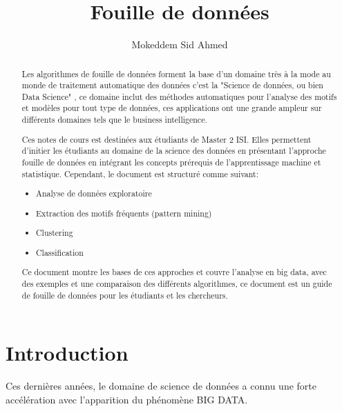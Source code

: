 \documentclass[runningheads,a4paper]{llncs}
\begin{document}
\mainmatter 

\title{Fouille de données}


\author{Mokeddem Sid Ahmed}



	
\tocauthor{{}}

\maketitle

\begin{abstract}
Les algorithmes de fouille de données forment la base d'un domaine très à la mode au monde de traitement automatique des données c'est la "Science de données, ou bien Data Science" , ce domaine inclut des méthodes automatiques pour l'analyse des motifs et modèles pour tout type de données, ces applications ont une grande ampleur sur différents domaines tels que le business intelligence. 

Ces notes de cours est destinées aux étudiants de Master 2 ISI. Elles permettent d'initier les étudiants au domaine de la science des données en présentant l'approche fouille de données en intégrant les concepts prérequis de l'apprentissage machine et statistique. Cependant, le document est structuré comme suivant: 
\begin{itemize}
  \item Analyse de données exploratoire
  \item Extraction des motifs fréquents (pattern mining)
  \item Clustering
  \item Classification
\end{itemize}   
Ce document montre les bases de ces approches et couvre l'analyse en big data, avec des exemples et une comparaison des différents algorithmes, ce document est un guide de fouille de données pour les étudiants et les chercheurs. 
\end{abstract}
\medskip

\begingroup
\let\clearpage\relax
\tableofcontents
{}
\endgroup

\medskip
\medskip

\section*{Introduction}
Ces dernières années, le domaine de science de données a connu une forte accélération avec l’apparition du phénomène BIG DATA.
\end{document}
